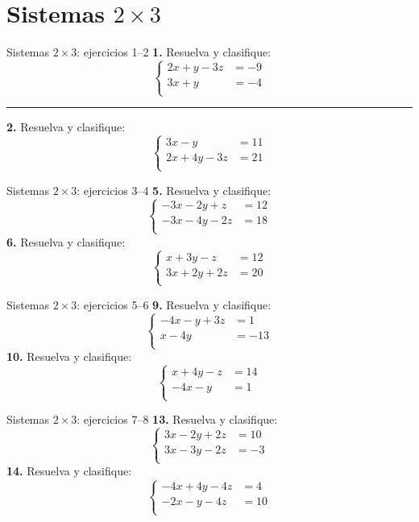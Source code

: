 \documentclass[aspectratio=169,9pt]{beamer}
\theoremstyle{remark}
\begin{document}
\section{Sistemas $2\times 3$}
\begin{frame}{Sistemas $2\times 3$: ejercicios 1--2}
\small
\textbf{1.} Resuelva y clasifique:
\[\left\{\begin{aligned}
2x+y-3z&=-9\\
3x+y&=-4\\
\end{aligned}\right.\]
\vspace{0.2em}\hrule\vspace{0.3em}
\textbf{2.} Resuelva y clasifique:
\[\left\{\begin{aligned}
3x-y&=11\\
2x+4y-3z&=21\\
\end{aligned}\right.\]
\end{frame}
\begin{frame}{Sistemas $2\times 3$: ejercicios 3--4}
\small
\textbf{5.} Resuelva y clasifique:
\[\left\{\begin{aligned}
-3x-2y+z&=12\\
-3x-4y-2z&=18\\
\end{aligned}\right.\]
\textbf{6.} Resuelva y clasifique:
\[\left\{\begin{aligned}
x+3y-z&=12\\
3x+2y+2z&=20\\
\end{aligned}\right.\]
\end{frame}
\begin{frame}{Sistemas $2\times 3$: ejercicios 5--6}
\small
\textbf{9.} Resuelva y clasifique:
\[\left\{\begin{aligned}
-4x-y+3z&=1\\
x-4y&=-13\\
\end{aligned}\right.\]
\textbf{10.} Resuelva y clasifique:
\[\left\{\begin{aligned}
x+4y-z&=14\\
-4x-y&=1\\
\end{aligned}\right.\]
\end{frame}
\begin{frame}{Sistemas $2\times 3$: ejercicios 7--8}
\small
\textbf{13.} Resuelva y clasifique:
\[\left\{\begin{aligned}
3x-2y+2z&=10\\
3x-3y-2z&=-3\\
\end{aligned}\right.\]
\textbf{14.} Resuelva y clasifique:
\[\left\{\begin{aligned}
-4x+4y-4z&=4\\
-2x-y-4z&=10\\
\end{aligned}\right.\]
\end{frame}
\end{document}
